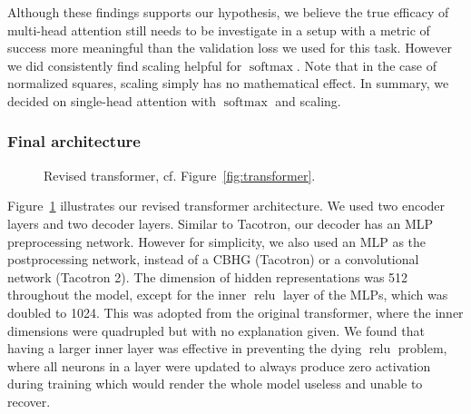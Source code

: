 \documentclass[11pt]{article}
\DeclareMathOperator{\softmax}{softmax}
\DeclareMathOperator{\relu}{relu}
\begin{document}
Although these findings supports our hypothesis,
we believe the true efficacy of multi-head attention still needs to be investigate in a setup
with a metric of success more meaningful than the validation loss we used for this task.
However we did consistently find scaling helpful for \(\softmax\).
Note that in the case of normalized squares, scaling simply has no mathematical effect.
In summary, we decided on single-head attention with \(\softmax\) and scaling.

\subsubsection*{Final architecture}

\begin{figure}
\centering
{}
\caption[]{\label{fig:arch}Revised transformer, cf. Figure~\ref{fig:transformer}.}
\end{figure}

Figure~\ref{fig:arch} illustrates our revised transformer architecture.
We used two encoder layers and two decoder layers.
Similar to Tacotron, our decoder has an MLP preprocessing network.
However for simplicity, we also used an MLP as the postprocessing network,
instead of a CBHG (Tacotron) or a convolutional network (Tacotron 2).
The dimension of hidden representations was 512 throughout the model,
except for the inner \(\relu\) layer of the MLPs,
which was doubled to 1024.
This was adopted from the original transformer,
where the inner dimensions were quadrupled but with no explanation given.
We found that having a larger inner layer was effective in preventing the dying \(\relu\) problem,
where all neurons in a layer were updated to always produce zero activation during training
which would render the whole model useless and unable to recover.
\end{document}
